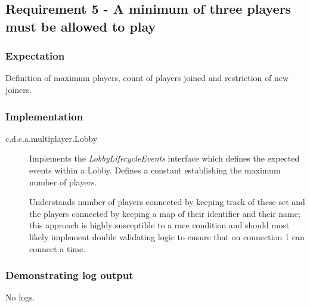 \subsection{Requirement 5 - A minimum of three players must be allowed to play} 

\subsubsection{Expectation} 
Definition of maximum players, count of players joined and restriction of new joiners.

\subsubsection{Implementation}

\begin{description}
	\item[c.d.c.a.multiplayer.Lobby] Implements the \textit{LobbyLifecycleEvents} interface which defines the expected events within a Lobby. Defines a constant establishing the maximum number of players. 
	
	Understands number of players connected by keeping track of these set and the players connected by keeping a map of their identifier and their name; this approach is highly susceptible to a race condition and should most likely implement double validating logic to ensure that on connection 1 can connect a time. 
\end{description}

\subsubsection{Demonstrating log output} 

No logs.